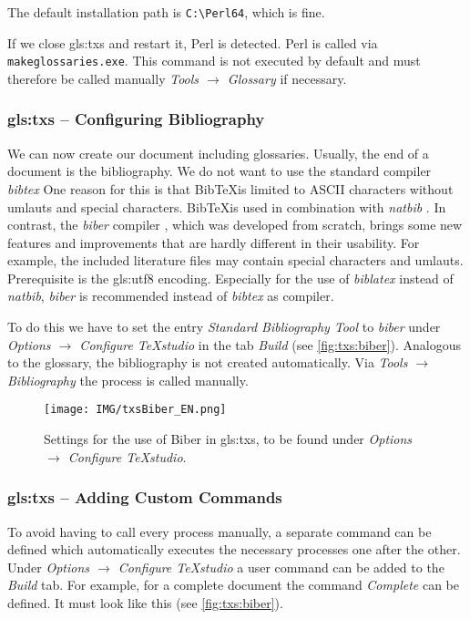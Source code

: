 The default installation path is \verb|C:\Perl64|, which is fine.

If we close \gls{gls:txs} and restart it, Perl is detected. Perl is called via \verb|makeglossaries.exe|. This command is not executed by default and must therefore be called manually \textit{Tools $\rightarrow$ Glossary} if necessary. 




\subsubsection{\gls*{gls:txs} -- Configuring Bibliography}
\label{sec:txs:bibliography}
We can now create our document including glossaries. Usually, the end of a document is the bibliography. We do not want to use the standard compiler \textit{bibtex} \cite{CTANTeam.2020ae} One reason for this is that Bib\TeX is limited to ASCII characters without umlauts and special characters. Bib\TeX is used in combination with \textit{natbib} \cite{CTANTeam.2020ad}. In contrast, the \textit{biber} compiler \cite{CTANTeam.2020af}, which was developed from scratch, brings some new features and improvements that are hardly different in their usability. For example, the included literature files may contain special characters and umlauts. Prerequisite is the \gls{gls:utf8} encoding. Especially for the use of \textit{biblatex} \cite{CTANTeam.2020ag} instead of \textit{natbib}, \textit{biber} is recommended instead of \textit{bibtex} as compiler.

To do this we have to set the entry \textit{Standard Bibliography Tool} to \textit{biber} under \textit{Options $\rightarrow$ Configure TeXstudio} in the tab \textit{Build} (see \autoref{fig:txs:biber}). Analogous to the glossary, the bibliography is not created automatically. Via \textit{Tools $\rightarrow$ Bibliography} the process is called manually.

\begin{figure}[htb]
	\texttt{[image: IMG/txsBiber\_EN.png]}
	\caption[Settings for \gls{gls:txs} -- Biber]{Settings for the use of Biber in \gls{gls:txs}, to be found under \textit{Options $\rightarrow$ Configure TeX\-studio}.}
	\label{fig:txs:biber}
\end{figure}




\subsubsection{\gls*{gls:txs} -- Adding Custom Commands}
\label{sec:txs:customCommands}
To avoid having to call every process manually, a separate command can be defined which automatically executes the necessary processes one after the other. Under \textit{Options $\rightarrow$ Configure TeXstudio } a user command can be added to the \textit{Build} tab. For example, for a complete document the command \textit{Complete} can be defined.  It must look like this (see \autoref{fig:txs:biber}).

